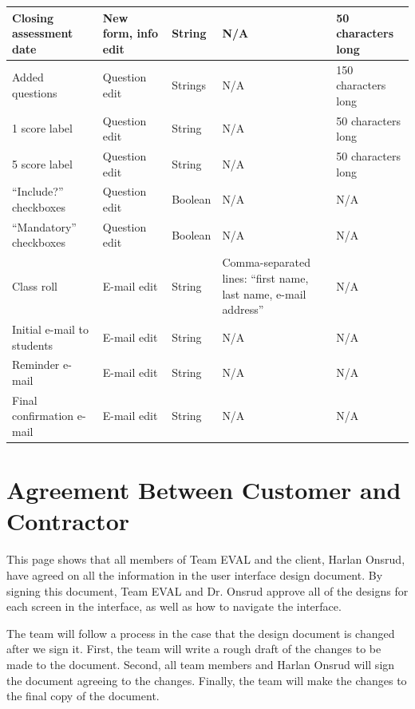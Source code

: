 \documentclass{article}
\begin{document}
\begin{center}
{\begin{tabular}{|p{4.4cm}|p{2.4cm}|p{1.5cm}|p{4cm}|p{3cm}|}
\hline
Closing assessment date & New form, info edit & String & N/A & 50 characters long\\ 
\hline
Added questions & Question edit & Strings & N/A & 150 characters long\\ 
\hline
1 score label & Question edit & String & N/A & 50 characters long\\
\hline
5 score label & Question edit & String & N/A & 50 characters long\\
\hline
``Include?'' checkboxes & Question edit & Boolean & N/A & N/A \\ 
\hline
``Mandatory'' checkboxes & Question edit & Boolean & N/A & N/A \\ 
\hline
Class roll & E-mail edit & String & Comma-separated lines: \newline ``first name, last name, e-mail address'' & N/A \\ 
\hline
Initial e-mail to students & E-mail edit & String & N/A & N/A \\ 
\hline
Reminder e-mail & E-mail edit & String & N/A & N/A\\ 
\hline
Final confirmation e-mail & E-mail edit & String & N/A & N/A\\ 
\hline
\end{tabular}
}
\end{center}

\appendix
{}

\newpage
\section{Agreement Between Customer and Contractor}
This page shows that all members of Team EVAL and the client, Harlan Onsrud, have agreed on all the information in the user interface design document. By signing this document, Team EVAL and Dr. Onsrud approve all of the designs for each screen in the interface, as well as how to navigate the interface.

The team will follow a process in the case that the design document is changed after we sign it. First, the team will write a rough draft of the changes to be made to the document. Second, all team members and Harlan Onsrud will sign the document agreeing to the changes. Finally, the team will make the changes to the final copy of the document.
\end{document}
